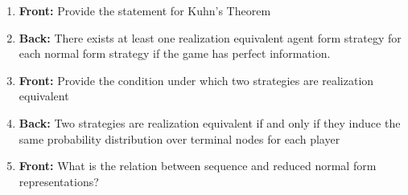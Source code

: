 \documentclass{article}
\begin{document}
\begin{enumerate}
    
    \newpage\item \textbf{Front:} Provide the statement for Kuhn's Theorem
    \newpage\item \textbf{Back:} There exists at least one realization equivalent agent form strategy for each normal form strategy if the game has perfect information.\newpage
    \newpage\item \textbf{Front:} Provide the condition under which two strategies are realization equivalent
    \newpage\item \textbf{Back:} Two strategies are realization equivalent if and only if they induce the same probability distribution over terminal nodes for each player
    \newpage\item \textbf{Front:} What is the relation between sequence and reduced normal form representations?
    
\end{enumerate}
\end{document}
